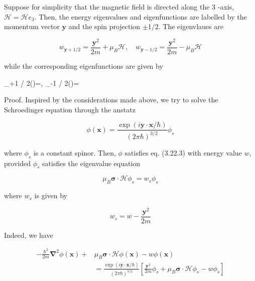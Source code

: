 \documentclass{article}
\begin{document}
Suppose for simplicity that the magnetic field is directed along the 3 -axis, $\mathcal{H}=\mathcal{H} e_{3}$. Then, the energy eigenvalues and eigenfunctions are labelled by the momentum vector $\boldsymbol{y}$ and the spin projection $\pm 1 / 2$. The eigenvlaues are
 
\begin{equation*}
w_{\boldsymbol{y}+1 / 2}=\frac{\boldsymbol{y}^{2}}{2 m}+\mu_{B} \mathcal{H}, \quad w_{\boldsymbol{y}-1 / 2}=\frac{\boldsymbol{y}^{2}}{2 m}-\mu_{B} \mathcal{H} \tag{3.22.4}
\end{equation*}
 
while the corresponding eigenfunctions are given by
 
\phi_{+1 / 2}()=, \quad \phi_{-1 / 2}()=\left[\begin{array}{l}
0 \\
1
\end{array}\right]
 

Proof. Inspired by the considerations made above, we try to solve the Schroedinger equation through the anstatz
 
\begin{equation*}
\phi(\boldsymbol{x})=\frac{\exp (i \boldsymbol{y} \cdot \boldsymbol{x} / \hbar)}{(2 \pi \hbar)^{3 / 2}} \phi_{s} \tag{3.22.6}
\end{equation*}
 
where $\phi_{s}$ is a constant spinor. Then, $\phi$ satisfies eq. (3.22.3) with energy value $w$, provided $\phi_{s}$ satisfies the eigenvalue equation
 
\begin{equation*}
\mu_{B} \boldsymbol{\sigma} \cdot \mathcal{H} \phi_{s}=w_{s} \phi_{s} \tag{3.22.7}
\end{equation*}
 
where $w_{s}$ is given by
 
\begin{equation*}
w_{s}=w-\frac{\boldsymbol{y}^{2}}{2 m} \tag{3.22.8}
\end{equation*}
 

Indeed, we have
 
\begin{align*}
-\frac{\hbar^{2}}{2 m} \boldsymbol{\nabla}^{2} \phi(\boldsymbol{x})+ & \mu_{B} \boldsymbol{\sigma} \cdot \boldsymbol{\mathcal { H }} \phi(\boldsymbol{x})-w \phi(\boldsymbol{x})  \tag{3.22.9}\\
& =\frac{\exp (i \boldsymbol{y} \cdot \boldsymbol{x} / \hbar)}{(2 \pi \hbar)^{3 / 2}}\left[\frac{\boldsymbol{y}^{2}}{2 m} \phi_{s}+\mu_{B} \boldsymbol{\sigma} \cdot \boldsymbol{\mathcal { H }} \phi_{s}-w \phi_{s}\right]
\end{align*}
 
\end{document}

